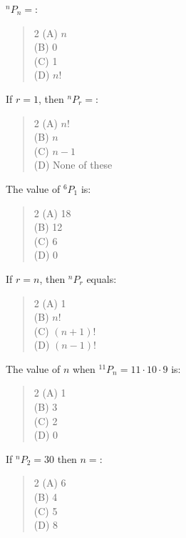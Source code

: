 \documentclass[11pt,a4paper]{article}
\begin{document}
\begin{mcqlist}
\item $^nP_n=$:
\begin{quote}\begin{multicols}{2}
\noindent (A) $n$ \\
(B) 0 \\
(C) 1 \\
(D) $n!$
\end{multicols}\end{quote}

\item If $r=1$, then $^nP_r=$:
\begin{quote}\begin{multicols}{2}
\noindent (A) $n!$ \\
(B) $n$ \\
(C) $n-1$ \\
(D) None of these
\end{multicols}\end{quote}

\item The value of $^6P_1$ is:
\begin{quote}\begin{multicols}{2}
\noindent (A) 18 \\
(B) 12 \\
(C) 6 \\
(D) 0
\end{multicols}\end{quote}

\item If $r=n$, then $^nP_r$ equals:
\begin{quote}\begin{multicols}{2}
\noindent (A) 1 \\
(B) $n!$ \\
(C) $(n+1)!$ \\
(D) $(n-1)!$
\end{multicols}\end{quote}

\item The value of $n$ when $^{11}P_n=11\cdot10\cdot9$ is:
\begin{quote}\begin{multicols}{2}
\noindent (A) 1 \\
(B) 3 \\
(C) 2 \\
(D) 0
\end{multicols}\end{quote}

\item If $^nP_2=30$ then $n=$:
\begin{quote}\begin{multicols}{2}
\noindent (A) 6 \\
(B) 4 \\
(C) 5 \\
(D) 8
\end{multicols}\end{quote}


\end{mcqlist}
\end{document}
